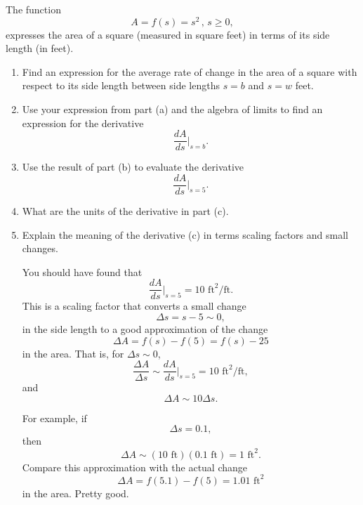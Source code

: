 \documentclass{ximera}
\begin{document}
\begin{question}  \label{QPodfoitte43}
The function
\[
         A = f(s) =s^2 \, , \, s\geq 0 ,
\]
expresses the area of a square (measured in square feet) in terms of its side length (in feet).

\begin{enumerate}
\item Find an expression for the average rate of change in the area of a square with respect to its side length between side lengths $s=b$ and $s=w$ feet.

\item Use your expression from part (a) and the algebra of limits to find an expression for the derivative
\[
      \frac{dA}{ds}\Big|_{s=b}.
\]

\item Use the result of part (b) to evaluate the derivative
\[
   \frac{dA}{ds}\Big|_{s=5}.
\]

\item What are the units of the derivative in part (c).

\item Explain the meaning of the derivative (c) in terms scaling factors and small changes.

\begin{explanation}
You should have found that
\[
    \frac{dA}{ds}\Big|_{s=5} = 10 \text{ ft}^2/\text{ft} .
\]
This is a scaling factor that converts a small change
\[
    \Delta s = s-5 \sim 0,
\]
in the side length to a good approximation of the change  
\[
   \Delta A = f(s) - f(5) = f(s)-25
\]
in the area. That is, for $\Delta s \sim 0$,
\[
  \frac{\Delta A}{\Delta s} \sim \frac{dA}{ds}\Big|_{s=5} = 10 \text{ ft}^2/\text{ft},
\]
and
\[
   \Delta A \sim 10 \Delta s. 
\]

For example, if 
\[
 \Delta s = 0.1 ,
\]
then 
\[
    \Delta A \sim (10 \text{ ft} ) (0.1 \text{ ft}) = 1 \text{ ft}^2.
\]
Compare this approximation with the actual change
\[
   \Delta A = f(5.1) - f(5) = 1.01 \text{ ft}^2
\]
in the area. Pretty good.
\end{explanation}

\end{enumerate}

\end{question}
\end{document}
